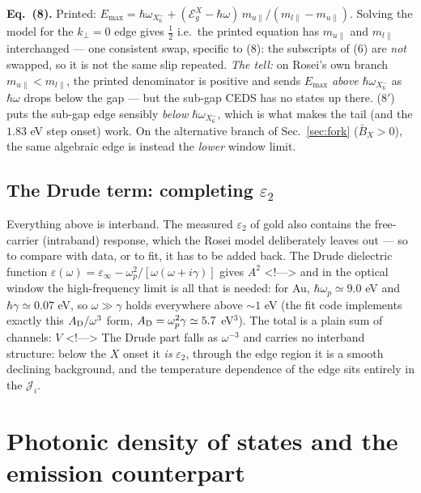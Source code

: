 \documentclass[11pt,a4paper]{article}
\numberwithin{equation}{section}
\begin{document}
\medskip
\textbf{Eq.\ (8).}  Printed:
$E_{\max}={\hbar\omega_{X_6^-}}+({\mathcal{E}_g^{X}}-{\hbar\omega})\,m_{u\parallel}/(m_{l\parallel}-m_{u\parallel})$.
Solving the model for the ${k_{\perp}}=0$ edge gives
$\tfrac12$
i.e.\ the printed equation has $m_{u\parallel}$ and $m_{l\parallel}$
interchanged --- one consistent swap, specific to (8): the subscripts
of (6) are \emph{not} swapped, so it is not the same slip repeated.
\emph{The tell:} on Rosei's own branch $m_{u\parallel}<m_{l\parallel}$,
the printed denominator is positive and sends $E_{\max}$ \emph{above}
${\hbar\omega_{X_6^-}}$ as ${\hbar\omega}$ drops below the gap --- but the sub-gap CEDS has no
states up there.  ($8'$) puts the sub-gap edge sensibly \emph{below}
${\hbar\omega_{X_6^-}}$, which is what makes the tail (and the $1.83$ eV step onset)
work.  On the alternative branch of Sec.~\ref{sec:fork}
(${\bar{B}}_X>0$), the same algebraic edge is instead the \emph{lower}
window limit.

\subsection{The Drude term: completing ${\varepsilon}_2$}\label{sec:drude}

Everything above is interband.  The measured ${\varepsilon}_2$ of gold also
contains the free-carrier (intraband) response, which the Rosei model
deliberately leaves out --- so to compare with data, or to fit, it has
to be added back.  The Drude dielectric function
${\varepsilon}(\omega)={\varepsilon}_\infty-\omega_p^2/[\omega(\omega+i\gamma)]$ gives
$A^2$
<!--\label{eq:drude}-->
and in the optical window the high-frequency limit is all that is
needed: for Au, $\hbar\omega_p\simeq9.0$ eV and
$\hbar\gamma\simeq0.07$ eV, so $\omega\gg\gamma$ holds everywhere
above $\sim\!1$ eV (the fit code implements exactly this
$A_{\rm D}/\omega^3$ form, $A_{\rm D}=\omega_p^2\gamma\simeq5.7$
eV$^3$).  The total is a plain sum of channels:
$V$
<!--\label{eq:total}-->
The Drude part falls as $\omega^{-3}$ and carries no interband
structure: below the $X$ onset it \emph{is} ${\varepsilon}_2$, through the edge
region it is a smooth declining background, and the temperature
dependence of the edge sits entirely in the ${\mathcal{J}}_i$.

\section{Photonic density of states and the emission counterpart}
\label{sec:photonic}
\end{document}
